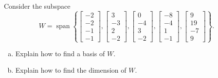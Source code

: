 
\begin{exerciseStatement}


Consider the subspace \[W=\operatorname{span}  \left\{ \left[\begin{array}{c}
-2 \\
-2 \\
-1 \\
-1
\end{array}\right] , \left[\begin{array}{c}
3 \\
-3 \\
2 \\
-2
\end{array}\right] , \left[\begin{array}{c}
0 \\
-4 \\
3 \\
-2
\end{array}\right] , \left[\begin{array}{c}
-8 \\
-4 \\
1 \\
-1
\end{array}\right] , \left[\begin{array}{c}
9 \\
19 \\
-7 \\
9
\end{array}\right] \right\} .\]


\begin{enumerate}[(a)]
\item  Explain how to find a basis of \(W\).
\item  Explain how to find the dimension of \(W\).
\end{enumerate}
    
\end{exerciseStatement}
    
